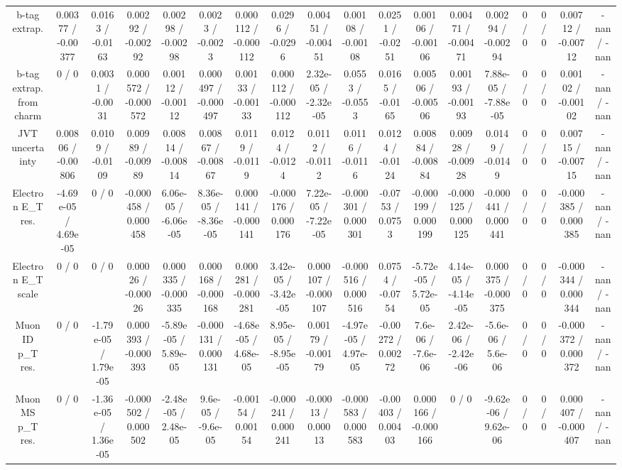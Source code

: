 \documentclass[10pt]{article}
\begin{document}
\begin{table}[htbp]
\begin{center}
\begin{tabular}{|c|c|c|c|c|c|c|c|c|c|c|c|c|c|c|c|c|c|}
  b-tag extrap. & 0.00377 / -0.00377 & 0.0163 / -0.0163 & 0.00292 / -0.00292 & 0.00298 / -0.00298 & 0.0023 / -0.0023 & 0.000112 / -0.000112 & 0.0296 / -0.0296 & 0.00451 / -0.00451 & 0.00108 / -0.00108 & 0.0251 / -0.0251 & 0.00106 / -0.00106 & 0.00471 / -0.00471 & 0.00294 / -0.00294 & 0 / 0 & 0 / 0 & 0.00712 / -0.00712 & -nan / -nan \\ 
  b-tag extrap. from charm & 0 / 0 & 0.0031 / -0.0031 & 0.000572 / -0.000572 & 0.00112 / -0.00112 & 0.000497 / -0.000497 & 0.00133 / -0.00133 & 0.000112 / -0.000112 & 2.32e-05 / -2.32e-05 & 0.0553 / -0.0553 & 0.0165 / -0.0165 & 0.00506 / -0.00506 & 0.00193 / -0.00193 & 7.88e-05 / -7.88e-05 & 0 / 0 & 0 / 0 & 0.00102 / -0.00102 & -nan / -nan \\ 
  JVT uncertainty & 0.00806 / -0.00806 & 0.0109 / -0.0109 & 0.00989 / -0.00989 & 0.00814 / -0.00814 & 0.00867 / -0.00867 & 0.0119 / -0.0119 & 0.0124 / -0.0124 & 0.0112 / -0.0112 & 0.0116 / -0.0116 & 0.0124 / -0.0124 & 0.00884 / -0.00884 & 0.00928 / -0.00928 & 0.0149 / -0.0149 & 0 / 0 & 0 / 0 & 0.00715 / -0.00715 & -nan / -nan \\ 
  Electron E_{T} res. & -4.69e-05 / 4.69e-05 & 0 / 0 & -0.000458 / 0.000458 & 6.06e-05 / -6.06e-05 & 8.36e-05 / -8.36e-05 & 0.000141 / -0.000141 & -0.000176 / 0.000176 & 7.22e-05 / -7.22e-05 & -0.000301 / 0.000301 & -0.0753 / 0.0753 & -0.000199 / 0.000199 & -0.000125 / 0.000125 & -0.000441 / 0.000441 & 0 / 0 & 0 / 0 & -0.000385 / 0.000385 & -nan / -nan \\ 
  Electron E_{T} scale & 0 / 0 & 0 / 0 & 0.00026 / -0.00026 & 0.000335 / -0.000335 & 0.000168 / -0.000168 & 0.000281 / -0.000281 & 3.42e-05 / -3.42e-05 & 0.000107 / -0.000107 & -0.000516 / 0.000516 & 0.0754 / -0.0754 & -5.72e-05 / 5.72e-05 & 4.14e-05 / -4.14e-05 & 0.000375 / -0.000375 & 0 / 0 & 0 / 0 & -0.000344 / 0.000344 & -nan / -nan \\ 
  Muon ID p_{T} res. & 0 / 0 & -1.79e-05 / 1.79e-05 & 0.000393 / -0.000393 & -5.89e-05 / 5.89e-05 & -0.000131 / 0.000131 & -4.68e-05 / 4.68e-05 & 8.95e-05 / -8.95e-05 & 0.00179 / -0.00179 & -4.97e-05 / 4.97e-05 & -0.00272 / 0.00272 & 7.6e-06 / -7.6e-06 & 2.42e-06 / -2.42e-06 & -5.6e-06 / 5.6e-06 & 0 / 0 & 0 / 0 & -0.000372 / 0.000372 & -nan / -nan \\ 
  Muon MS p_{T} res. & 0 / 0 & -1.36e-05 / 1.36e-05 & -0.000502 / 0.000502 & -2.48e-05 / 2.48e-05 & 9.6e-05 / -9.6e-05 & -0.00154 / 0.00154 & -0.000241 / 0.000241 & -0.00013 / 0.00013 & -0.000583 / 0.000583 & -0.00403 / 0.00403 & 0.000166 / -0.000166 & 0 / 0 & -9.62e-06 / 9.62e-06 & 0 / 0 & 0 / 0 & 0.000407 / -0.000407 & -nan / -nan \\ 

\end{tabular}
\end{center}
\end{table}
\end{document}
